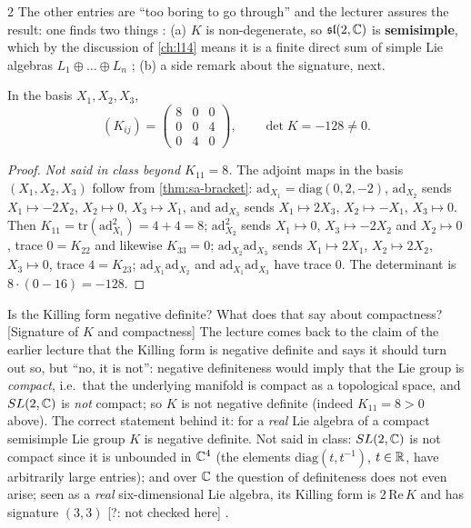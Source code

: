 \begin{paracol}{2}
The other entries are ``too boring to go through'' and the lecturer assures the result: one finds two things : (a) $K$ is non-degenerate, so $\mathfrak{sl}(2,\mathbb{C})$ is \textbf{semisimple}, which by the discussion of \cref{ch:l14} means it is a finite direct sum of simple Lie algebras $L_1\oplus\dots\oplus L_n$  ; (b) a side remark about the signature, next.
\begin{proposition}\label{prop:sa-killing}
In the basis $X_1,X_2,X_3$,
\[
  (K_{ij})=\begin{pmatrix}8&0&0\\0&0&4\\0&4&0\end{pmatrix},\qquad\det K=-128\ne0 .
\]
\end{proposition}
\begin{proof}
\emph{Not said in class beyond $K_{11}=8$.} The adjoint maps in the basis $(X_1,X_2,X_3)$ follow from \cref{thm:sa-bracket}: $\mathrm{ad}_{X_1}=\mathrm{diag}(0,2,-2)$, $\mathrm{ad}_{X_2}$ sends $X_1\mapsto-2X_2$, $X_2\mapsto0$, $X_3\mapsto X_1$, and $\mathrm{ad}_{X_3}$ sends $X_1\mapsto2X_3$, $X_2\mapsto-X_1$, $X_3\mapsto0$. Then $K_{11}=\mathrm{tr}(\mathrm{ad}_{X_1}^2)=4+4=8$; $\mathrm{ad}_{X_2}^2$ sends $X_1\mapsto0$, $X_3\mapsto-2X_2$ and $X_2\mapsto0$, trace $0=K_{22}$ and likewise $K_{33}=0$; $\mathrm{ad}_{X_2}\mathrm{ad}_{X_3}$ sends $X_1\mapsto2X_1$, $X_2\mapsto2X_2$, $X_3\mapsto0$, trace $4=K_{23}$; $\mathrm{ad}_{X_1}\mathrm{ad}_{X_2}$ and $\mathrm{ad}_{X_1}\mathrm{ad}_{X_3}$ have trace $0$. The determinant is $8\cdot(0-16)=-128$.
\end{proof}
\begin{answer}{Is the Killing form negative definite? What does that say about compactness?}[Signature of $K$ and compactness]
The lecture comes back to the claim of the earlier lecture that the Killing form is negative definite and says it should turn out so, but ``no, it is not'': negative definiteness would imply that the Lie group is \emph{compact}, i.e.\ that the underlying manifold is compact as a topological space, and $SL(2,\mathbb{C})$ is \emph{not} compact; so $K$ is not negative definite (indeed $K_{11}=8>0$ above). The correct statement behind it: for a \emph{real} Lie algebra of a compact semisimple Lie group $K$ is negative definite. Not said in class: $SL(2,\mathbb{C})$ is not compact since it is unbounded in $\mathbb{C}^4$ (the elements $\mathrm{diag}(t,t^{-1})$, $t\in\mathbb{R}$, have arbitrarily large entries); and over $\mathbb{C}$ the question of definiteness does not even arise; seen as a \emph{real} six-dimensional Lie algebra, its Killing form is $2\,\mathrm{Re}\,K$ and has signature $(3,3)$ [?: not checked here]    .
\end{answer}


\end{paracol}
